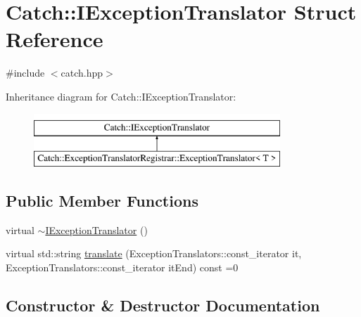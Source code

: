 \hypertarget{struct_catch_1_1_i_exception_translator}{}\section{Catch\+::I\+Exception\+Translator Struct Reference}
\label{struct_catch_1_1_i_exception_translator}


{\ttfamily \#include $<$catch.\+hpp$>$}

Inheritance diagram for Catch\+::I\+Exception\+Translator\+:\begin{figure}[H]
\begin{center}
\leavevmode
\includegraphics[height=2.000000cm]{struct_catch_1_1_i_exception_translator}
\end{center}
\end{figure}
\subsection*{Public Member Functions}
\begin{DoxyCompactItemize}
\item 
virtual \mbox{\hyperlink{struct_catch_1_1_i_exception_translator_afa00bb6258c07591df472aadae05783f}{$\sim$\+I\+Exception\+Translator}} ()
\item 
virtual std\+::string \mbox{\hyperlink{struct_catch_1_1_i_exception_translator_a2a554b96ed5ed411e7c796b6b42837a5}{translate}} (Exception\+Translators\+::const\+\_\+iterator it, Exception\+Translators\+::const\+\_\+iterator it\+End) const =0
\end{DoxyCompactItemize}


\subsection{Constructor \& Destructor Documentation}
\mbox{\label{struct_catch_1_1_i_exception_translator_afa00bb6258c07591df472aadae05783f}} 
